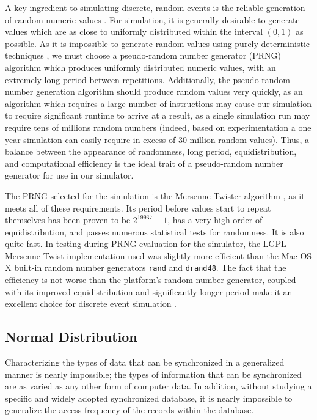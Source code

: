 A key ingredient to simulating discrete, random events is the reliable generation of random numeric values \cite{RefWorks:38}.  For simulation, it is generally desirable to generate values which are as close to uniformly distributed within the interval $(0, 1)$ as possible.  As it is impossible to generate random values using purely deterministic techniques \cite{RefWorks:38}, we must choose a pseudo-random number generator (PRNG) algorithm which produces uniformly distributed numeric values, with an extremely long period between repetitions.  Additionally, the pseudo-random number generation algorithm should produce random values very quickly, as an algorithm which requires a large number of instructions may cause our simulation to require significant runtime to arrive at a result, as a single simulation run may require tens of millions random numbers (indeed, based on experimentation a one year simulation can easily require in excess of 30 million random values).  Thus, a balance between the appearance of randomness, long period, equidistribution, and computational efficiency is the ideal trait of a pseudo-random number generator for use in our simulator.

The PRNG selected for the simulation is the Mersenne Twister algorithm \cite{RefWorks:43}, as it meets all of these requirements.  Its period before values start to repeat themselves has been proven to be $2^{19937}-1$, has a very high order of equidistribution, and passes numerous statistical tests for randomness.  It is also quite fast.  In testing during PRNG evaluation for the simulator, the LGPL Mersenne Twist implementation used \cite{mersennetwistcode} was slightly more efficient than the Mac OS X built-in random number generators \texttt{rand} and \texttt{drand48}.  The fact that the efficiency is not worse than the platform's random number generator, coupled with its improved equidistribution and significantly longer period make it an excellent choice for discrete event simulation \cite{RefWorks:43}.

\subsection{Normal Distribution}\label{gaussian}

Characterizing the types of data that can be synchronized in a generalized manner is nearly impossible;  the types of information that can be synchronized are as varied as any other form of computer data.  In addition, without studying a specific and widely adopted synchronized database, it is nearly impossible to generalize the access frequency of the records within the database.

